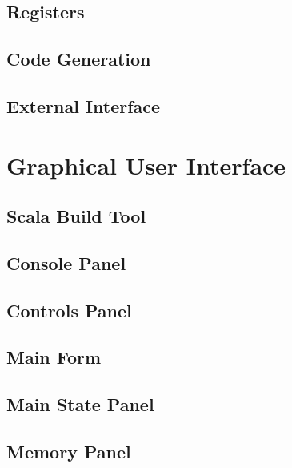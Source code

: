 \documentclass[a4paper,11pt]{report}
\begin{document}
\begin{appendices}
\subsection{Registers}\label{source:registers}

\subsection{Code Generation}\label{source:codegen}

\subsection{External Interface}\label{source:main}

\section{Graphical User Interface}
\subsection{Scala Build Tool}\label{source:sbt}

\subsection{Console Panel}\label{source:console_panel}

\subsection{Controls Panel}\label{source:controls_panel}

\subsection{Main Form}\label{source:main_form}

\subsection{Main State Panel}\label{source:main_state_panel}

\subsection{Memory Panel}\label{source:memory_panel}


\end{appendices}
\end{document}
